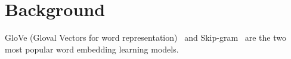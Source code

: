 \section{Background}

GloVe (Gloval Vectors for word representation)~\cite{pennington2014glove} and Skip-gram~\cite{mikolov2013efficient} are the two most popular word embedding learning models.
